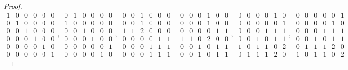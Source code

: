 \documentclass{amsart}
\begin{document}
\begin{proof}
$$ {\begin{smallmatrix}1 & 0 & 0 & 0 & 0 & 0 \\0 & 1 & 0 & 0 & 0 & 0 \\0 & 0 & 1 & 0 & 0 & 0 \\0 & 0 & 0 & 1 & 0 & 0 \\0 & 0 & 0 & 0 & 1 & 0 \\0 & 0 & 0 & 0 & 0 & 1\end{smallmatrix} , \ \begin{smallmatrix}0 & 1 & 0 & 0 & 0 & 0 \\1 & 0 & 0 & 0 & 0 & 0 \\0 & 0 & 1 & 0 & 0 & 0 \\0 & 0 & 0 & 1 & 0 & 0 \\0 & 0 & 0 & 0 & 0 & 1 \\0 & 0 & 0 & 0 & 1 & 0\end{smallmatrix} , \ \begin{smallmatrix}0 & 0 & 1 & 0 & 0 & 0 \\0 & 0 & 1 & 0 & 0 & 0 \\1 & 1 & 2 & 0 & 0 & 0 \\0 & 0 & 0 & 0 & 1 & 1 \\0 & 0 & 0 & 1 & 1 & 1 \\0 & 0 & 0 & 1 & 1 & 1\end{smallmatrix} , \ \begin{smallmatrix}0 & 0 & 0 & 1 & 0 & 0 \\0 & 0 & 0 & 1 & 0 & 0 \\0 & 0 & 0 & 0 & 1 & 1 \\1 & 1 & 0 & 2 & 0 & 0 \\0 & 0 & 1 & 0 & 1 & 1 \\0 & 0 & 1 & 0 & 1 & 1\end{smallmatrix} , \ \begin{smallmatrix}0 & 0 & 0 & 0 & 1 & 0 \\0 & 0 & 0 & 0 & 0 & 1 \\0 & 0 & 0 & 1 & 1 & 1 \\0 & 0 & 1 & 0 & 1 & 1 \\1 & 0 & 1 & 1 & 0 & 2 \\0 & 1 & 1 & 1 & 2 & 0\end{smallmatrix} , \ \begin{smallmatrix}0 & 0 & 0 & 0 & 0 & 1 \\0 & 0 & 0 & 0 & 1 & 0 \\0 & 0 & 0 & 1 & 1 & 1 \\0 & 0 & 1 & 0 & 1 & 1 \\0 & 1 & 1 & 1 & 2 & 0 \\1 & 0 & 1 & 1 & 0 & 2\end{smallmatrix}} $$

\end{proof}
\end{document}
